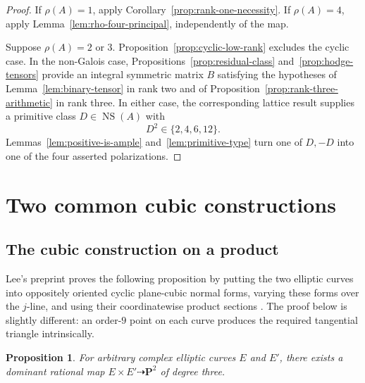 \documentclass[12pt]{amsart}
\numberwithin{equation}{section}
\newtheorem{proposition}[theorem]{Proposition}
\theoremstyle{definition}
\theoremstyle{remark}
\newcommand{\PP}{\mathbf P}
\newcommand{\NS}{\operatorname{NS}}
\begin{document}
\begin{proof}
If \(\rho(A)=1\), apply
Corollary~\ref{prop:rank-one-necessity}.  If \(\rho(A)=4\), apply
Lemma~\ref{lem:rho-four-principal}, independently of the map.

Suppose \(\rho(A)=2\) or \(3\).  Proposition~\ref{prop:cyclic-low-rank}
excludes the cyclic case.  In the non-Galois case,
Propositions~\ref{prop:residual-class} and~\ref{prop:hodge-tensors}
provide an integral symmetric matrix \(B\) satisfying the hypotheses of
Lemma~\ref{lem:binary-tensor} in rank two and of
Proposition~\ref{prop:rank-three-arithmetic} in rank three.  In either
case, the corresponding lattice result supplies a primitive class
\(D\in\NS(A)\) with
\[
                         D^2\in\{2,4,6,12\}.
\]
Lemmas~\ref{lem:positive-is-ample} and~\ref{lem:primitive-type}
turn one of \(D,-D\) into one of the four asserted polarizations.
\end{proof}

\section{Two common cubic constructions}\label{sec:common}

\subsection{The cubic construction on a product}

Lee's preprint proves the following proposition by putting the two elliptic
curves into oppositely oriented cyclic plane-cubic normal forms, varying
these forms over the $j$-line, and using their coordinatewise product
sections \cite[Theorem~1.1]{Lee}.  The proof below is
slightly different: an order-$9$ point on each curve produces the required
tangential triangle intrinsically.

\begin{proposition}\label{prop:product}
For arbitrary complex elliptic curves $E$ and $E'$, there exists a
dominant rational map $E\times E'\dashrightarrow\PP^2$ of degree three.
\end{proposition}
\end{document}

